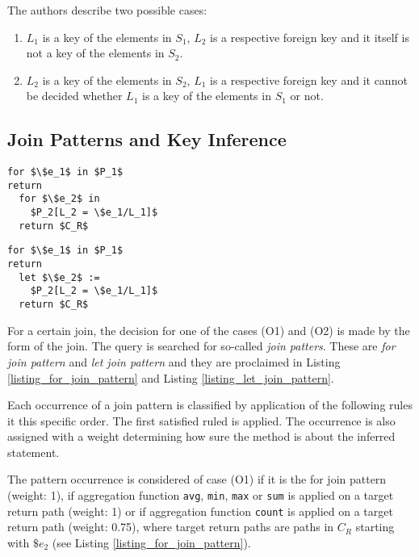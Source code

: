 The authors describe two possible cases:

\begin{enumerate}
\renewcommand{\theenumi}{(O\arabic{enumi})}
\renewcommand{\labelenumi}{\theenumi}
\item $L_1$ is a key of the elements in $S_1$, $L_2$ is a respective foreign key and it itself is not a key of the elements in $S_2$.
\item $L_2$ is a key of the elements in $S_2$, $L_1$ is a respective foreign key and it cannot be decided whether $L_1$ is a key of the elements in $S_1$ or not.
\end{enumerate}

\subsection{Join Patterns and Key Inference}
\begin{lstlisting}[mathescape, float, caption=For join pattern., frame=single, label=listing_for_join_pattern]
for $\$e_1$ in $P_1$
return
  for $\$e_2$ in
    $P_2[L_2 = \$e_1/L_1]$
  return $C_R$
\end{lstlisting}

\begin{lstlisting}[mathescape, float, caption=Let join pattern., frame=single, label=listing_let_join_pattern]
for $\$e_1$ in $P_1$
return
  let $\$e_2$ :=
    $P_2[L_2 = \$e_1/L_1]$
  return $C_R$
\end{lstlisting}

For a certain join, the decision for one of the cases (O1) and (O2) is made by the form of the join. The query is searched for so-called \emph{join patters}. These are \emph{for join pattern} and \emph{let join pattern} and they are proclaimed in Listing \ref{listing_for_join_pattern} and Listing \ref{listing_let_join_pattern}.

Each occurrence of a join pattern is classified by application of the following rules it this specific order. The first satisfied ruled is applied. The occurrence is also assigned with a weight determining how sure the method is about the inferred statement.

The pattern occurrence is considered of case (O1) if it is the for join pattern (weight: 1), if aggregation function \texttt{avg}, \texttt{min}, \texttt{max} or \texttt{sum} is applied on a target return path (weight: 1) or if aggregation function \texttt{count} is applied on a target return path (weight: 0.75), where target return paths are paths in $C_R$ starting with $\$e_2$ (see Listing \ref{listing_for_join_pattern}).

